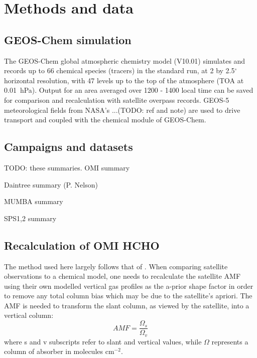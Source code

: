 \documentclass[acp, manuscript]{copernicus} %
\begin{document}
\section{Methods and data}
  \label{sec:MethodsAndData}
  
  \subsection{GEOS-Chem simulation}
    \label{sec:GEOSChemSimulation}
    The GEOS-Chem global atmospheric chemistry model (V10.01) simulates and records up to 66 chemical species (tracers) in the standard run, at 2 by 2.5$^{\circ}$ horizontal resolution, with 47 levels up to the top of the atmosphere (TOA at 0.01~hPa). 
    Output for an area averaged over 1200 - 1400 local time can be saved for comparison and recalculation with satellite overpass records.
    GEOS-5 meteorological fields from NASA's ...(TODO: ref and note) are used to drive transport and coupled with the chemical module of GEOS-Chem.
  
  \subsection{Campaigns and datasets}
    \label{sec:Campaigns}
    TODO: these summaries.
    OMI summary
    
    Daintree summary (P. Nelson)
    
    MUMBA summary
    
    SPS1,2 summary
  
  \subsection{Recalculation of OMI HCHO}
    The method used here largely follows that of \citet{Palmer2001}.
    When comparing satellite observations to a chemical model, one needs to recalculate the satellite AMF using their own modelled vertical gas profiles as the a-prior shape factor in order to remove any total column bias which may be due to the satellite's apriori.
    The AMF is needed to transform the slant column, as viewed by the satellite, into a vertical column:
    \begin{equation} \label{eqn:AMFratio}
      AMF = \frac{\Omega_s}{\Omega_v} %
    \end{equation}
    where s and v subscripts refer to slant and vertical values, while $\Omega$ represents a column of absorber in molecules cm$^{-2}$.
  
\end{document}
